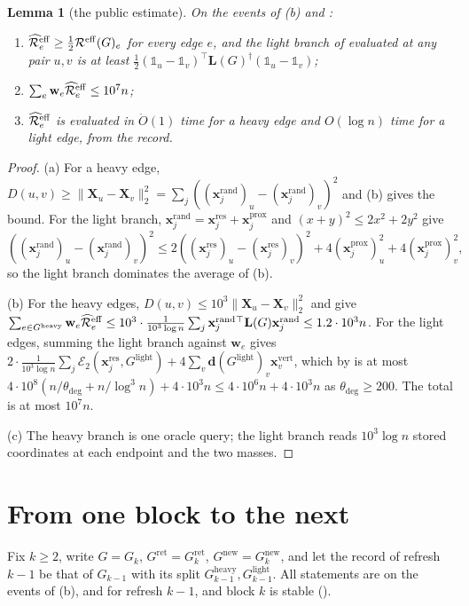 \documentclass[11pt]{article}
\newtheorem{lemma}[theorem]{Lemma}
\theoremstyle{remark}
\newcommand{\dd}{\mathbf d}
\newcommand{\LL}{\mathbf L}
\newcommand{\ww}{\mathbf w}
\newcommand{\xx}{\mathbf x}
\newcommand{\XX}{\mathbf X}
\newcommand{\xxproxy}{\xx^{\mathrm{prox}}}
\newcommand{\xxrand}{\xx^{\mathrm{rand}}}
\newcommand{\xxres}{\xx^{\mathrm{res}}}
\newcommand{\xxvert}{\xx^{\mathrm{vert}}}
\newcommand{\dheavy}{\theta_{\deg}}
\newcommand{\Ecal}[1]{\mathcal E_{#1}}
\newcommand{\Gh}{G^{\mathrm{heavy}}}
\newcommand{\Gl}{G^{\mathrm{light}}}
\newcommand{\Gret}{G^{\mathrm{ret}}}
\newcommand{\Gnew}{G^{\mathrm{new}}}
\newcommand{\Rcal}{\mathcal{R}}
\newcommand{\Reff}{\Rcal^{\mathrm{eff}}}
\newcommand{\Reffref}{\mathrlap{\widehat{\phantom{\Rcal}\mkern4mu}}\Rcal^{\mathrm{eff}}}
\newcommand{\norm}[1]{\lVert#1\rVert}
\newcommand{\Odouble}{\ddot{O}}
\newcommand{\oone}{\mathds{1}}
\begin{document}
\begin{lemma}[the public estimate]\label{lem:public}
On the events of (b) and :
\begin{enumerate}[label=(\alph*),leftmargin=*]
\item $\Reffref_e\ge\frac12\Reff(G)_e$ for every edge $e$, and the light branch
of  evaluated at any pair $u,v$ is at least
$\frac12(\oone_u-\oone_v)^{\top}\LL(G)^{\dag}(\oone_u-\oone_v)$;
\item $\sum_e\ww_e\Reffref_e\le10^{7}n$;
\item $\Reffref_e$ is evaluated in $\Odouble(1)$ time for a heavy edge and
$O(\log n)$ time for a light edge, from the record.
\end{enumerate}
\end{lemma}
\begin{proof}
(a) For a heavy edge, $D(u,v)\ge\norm{\XX_u-\XX_v}_2^{2}=\sum_j((\xxrand_j)_u-(\xxrand_j)_v)^{2}$
and (b) gives the bound.
For the light branch, $\xxrand_j=\xxres_j+\xxproxy_j$ and $(x+y)^{2}\le2x^{2}+2y^{2}$
give
\[
((\xxrand_j)_u-(\xxrand_j)_v)^{2}\le2((\xxres_j)_u-(\xxres_j)_v)^{2}+4(\xxproxy_j)_u^{2}+4(\xxproxy_j)_v^{2},
\]
so the light branch dominates the average of (b).

(b) For the heavy edges, $D(u,v)\le10^{3}\norm{\XX_u-\XX_v}_2^{2}$ and
 give
$\sum_{e\in\Gh}\ww_e\Reffref_e\le10^{3}\cdot\frac1{10^{3}\log n}\sum_j\xxrand_j{}^{\top}\LL(G)\xxrand_j\le1.2\cdot10^{3}n$.
For the light edges, summing the light branch against $\ww_e$ gives
$2\cdot\frac1{10^{3}\log n}\sum_j\Ecal2(\xxres_j,\Gl)+4\sum_v\dd(\Gl)_v\xxvert_v$,
which by  is at most
$4\cdot10^{8}(n/\dheavy+n/\log^{3}n)+4\cdot10^{3}n\le4\cdot10^{6}n+4\cdot10^{3}n$
as $\dheavy\ge200$.
The total is at most $10^{7}n$.

(c) The heavy branch is one oracle query; the light branch reads
$10^{3}\log n$ stored coordinates at each endpoint and the two masses.
\end{proof}

\section{From one block to the next}\label{sec:transfer}

Fix $k\ge2$, write $G=G_k$, $\Gret=\Gret_k$, $\Gnew=\Gnew_k$, and let the
record of refresh $k-1$ be that of $G_{k-1}$ with its split
$\Gh_{k-1},\Gl_{k-1}$.
All statements are on the events of (b), 
and  for refresh $k-1$, and block $k$ is stable
().
\end{document}
